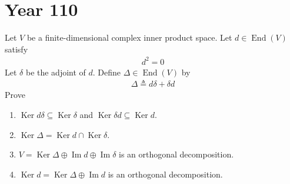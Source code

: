 \documentclass{report}
\begin{document}
\section{Year 110}
\begin{question}{}{}
Let $V$ be a finite-dimensional complex inner product space. Let $d\in \operatorname{End}(V)$ satisfy 
\begin{align*}
d^2=0
\end{align*}
Let $\delta$ be the adjoint of $d$. Define $\Delta \in \operatorname{End}(V)$ by 
\begin{align*}
\Delta \triangleq d\delta + \delta d
\end{align*}
Prove 
\begin{enumerate}[label=(\alph*)]
  \item $\operatorname{Ker}d\delta\subseteq \operatorname{Ker}\delta$ and $\operatorname{Ker}\delta d\subseteq \operatorname{Ker}d$.
  \item  $\operatorname{Ker}\Delta = \operatorname{Ker}d\cap \operatorname{Ker}\delta$. 
  \item $V= \operatorname{Ker}\Delta \oplus  \operatorname{Im}d \oplus  \operatorname{Im}\delta$ is an orthogonal decomposition. 
  \item $\operatorname{Ker}d=\operatorname{Ker}\Delta \oplus  \operatorname{Im}d$ is an orthogonal decomposition. 
\end{enumerate}
\end{question}
\end{document}
